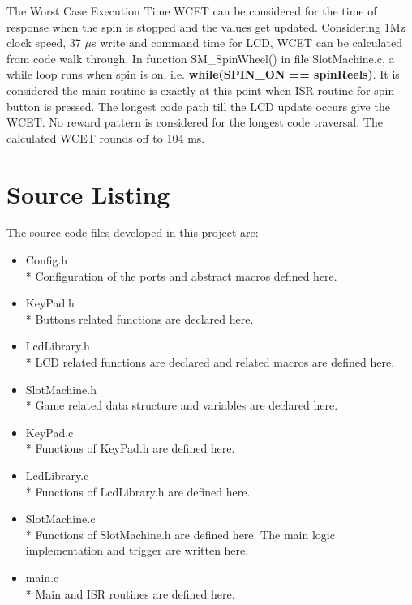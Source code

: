 \documentclass[a4paper,13pt,openany,sffamily]{memoir}
\begin{document}


The Worst Case Execution Time WCET can be considered for the time of response when the spin is stopped and the values get updated. Considering 1Mz clock speed, 37 \(\mu\)s write and command time for LCD, WCET can be calculated from code walk through. In function SM\_SpinWheel() in file SlotMachine.c, a while loop runs when spin is on, i.e. \textbf{while(SPIN\_ON == spinReels)}. It is considered the main routine is exactly at this point when ISR routine for spin button is pressed. The longest code path till the LCD update occurs give the WCET. No reward pattern is considered for the longest code traversal. The calculated WCET rounds off to 104 ms.


\chapter {Source Listing}

 The source code files developed in this project are:
\begin{itemize}
\item Config.h \\*
    Configuration of the ports and abstract macros defined here.
\item KeyPad.h \\*
    Buttons related functions are declared here.
\item LcdLibrary.h \\*
    LCD related functions are declared and related macros are defined here.
    
\item SlotMachine.h \\*
    Game related data structure and variables are declared here.
\item KeyPad.c \\*
    Functions of KeyPad.h are defined here.
\item LcdLibrary.c \\*
    Functions of LcdLibrary.h are defined here.
\item SlotMachine.c \\*
    Functions of SlotMachine.h are defined here. The main logic implementation and trigger are written here.
\item main.c \\*
    Main and ISR routines are defined here.
    
\end{itemize}
\end{document}
